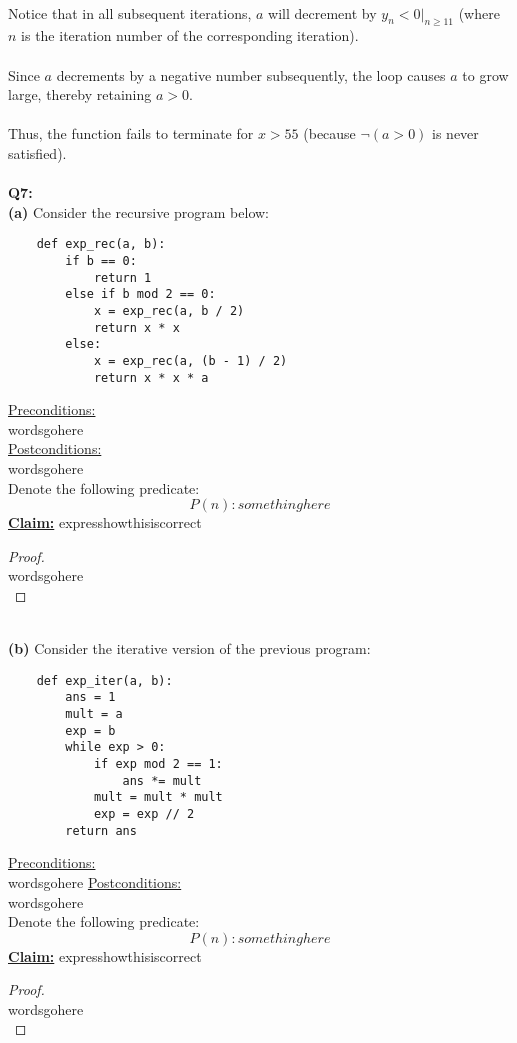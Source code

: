 \documentclass[12pt]{article}
\begin{document}
\\
Notice that in all subsequent iterations, $a$ will decrement by $y_n < 0 |_{n \geq 11}$ (where $n$ is the iteration number of the corresponding iteration). \\
\\
Since $a$ decrements by a negative number subsequently, the loop causes $a$ to grow large, thereby retaining $a > 0$. \\
\\
Thus, the function fails to terminate for $x > 55$ (because $\neg (a > 0)$ is never satisfied). \\
\\
\textbf{Q7:} \\
\textbf{(a)} Consider the recursive program below:
\begin{lstlisting}
    def exp_rec(a, b):
        if b == 0:
            return 1
        else if b mod 2 == 0:
            x = exp_rec(a, b / 2)
            return x * x
        else:
            x = exp_rec(a, (b - 1) / 2)
            return x * x * a
\end{lstlisting}
\underline{Preconditions:} \\
wordsgohere \\
\underline{Postconditions:} \\
wordsgohere \\
Denote the following predicate:
\[P(n): somethinghere\]
\textbf{\underline{Claim:}} expresshowthisiscorrect
\begin{proof}
\leavevmode\\
    wordsgohere \\
\end{proof}
\leavevmode\\
\textbf{(b)} Consider the iterative version of the previous program:
\begin{lstlisting}
    def exp_iter(a, b):
        ans = 1
        mult = a
        exp = b
        while exp > 0:
            if exp mod 2 == 1:
                ans *= mult
            mult = mult * mult
            exp = exp // 2
        return ans
\end{lstlisting}
\underline{Preconditions:} \\
wordsgohere
\underline{Postconditions:} \\
wordsgohere
\\
Denote the following predicate:
\[P(n): somethinghere\]
\textbf{\underline{Claim:}} expresshowthisiscorrect
\begin{proof}
\leavevmode\\
    wordsgohere \\
\end{proof}
\end{document}
